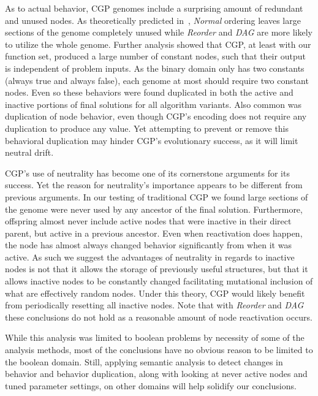 \documentclass[journal]{IEEEtran}
\begin{document}
As to actual behavior, CGP genomes include a surprising amount of redundant and
unused nodes.  As theoretically predicted in~\cite{goldman:2013:ordering},
\emph{Normal} ordering leaves large sections of the genome completely unused
while \emph{Reorder} and \emph{DAG} are more likely to utilize the whole genome.
Further analysis showed that CGP, at least with our function set, produced a large
number of constant nodes, such that their output is independent of problem
inputs.  As the binary domain only has two constants (always true and always false),
each genome at most should require two constant nodes.  Even so these behaviors
were found duplicated in both the active and inactive portions of final solutions
for all algorithm variants.  Also common was duplication of node behavior, even
though CGP's encoding does not require any duplication to produce any value.  Yet
attempting to prevent or remove this behavioral duplication may hinder CGP's evolutionary
success, as it will limit neutral drift.

CGP's use of neutrality has become one of its cornerstone arguments for its success.
Yet the reason for neutrality's importance appears to be different from previous
arguments.  In our testing of traditional CGP we found large sections of the
genome were never used by any ancestor of the final solution.  Furthermore,
offspring almost never include active nodes that were inactive in their direct
parent, but active in a previous ancestor.  Even when reactivation does happen,
the node has almost always changed behavior significantly from when it was active.
As such we suggest the advantages of neutrality in regards to inactive nodes is
not that it allows the storage of previously useful structures, but that it allows
inactive nodes to be constantly changed facilitating mutational inclusion of what
are effectively random nodes.  Under this theory, CGP would likely benefit from periodically resetting
all inactive nodes.  Note that with \emph{Reorder}
and \emph{DAG} these conclusions do not hold as a reasonable amount of node
reactivation occurs.

While this analysis was limited to boolean problems by necessity of some of
the analysis methods, most of the conclusions have no obvious reason to be
limited to the boolean domain.  Still, applying semantic analysis
to detect changes in behavior and behavior duplication, along with looking at
never active nodes and tuned parameter settings, on other domains will help
solidify our conclusions.

\end{document}
